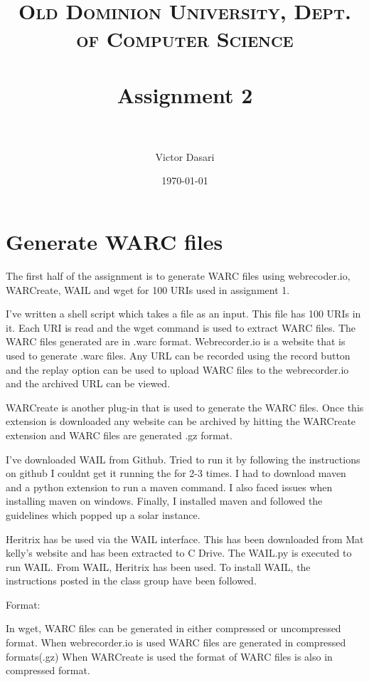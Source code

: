 \documentclass[paper=a4, fontsize=11pt]{scrartcl} %
\title{	
\normalfont \normalsize 
\textsc{Old Dominion University, Dept. of Computer Science} \\ [25pt] %
\horrule{0.5pt} \\[0.4cm] %
\huge Assignment 2 \\ %
\horrule{2pt} \\[0.5cm] %
}
\author{Victor Dasari} %
\date{\normalsize\today} %
\numberwithin{equation}{section} %
\numberwithin{figure}{section} %
\numberwithin{table}{section} %
\begin{document}
\maketitle %


\section{Generate WARC files}



The first half of the assignment is to generate WARC files using webrecoder.io, WARCreate, WAIL and wget for 100 URIs used in assignment 1.

I've written a shell script which takes a file as an input. This file has 100 URIs in it. Each URI is read and the wget command is used to extract WARC files. The WARC files generated are in .warc format.
Webrecorder.io is a website that is used to generate .warc files.
Any URL can be recorded using the record button and the replay option can be used to upload WARC files to the webrecorder.io and the archived URL can be viewed.

WARCreate is another plug-in that is used to generate the WARC files. Once this extension is downloaded any website can be archived by hitting the WARCreate extension and WARC files are generated .gz format.

I've downloaded WAIL from Github. Tried to run it by following the instructions on github I couldnt get it running the for 2-3 times. I had to download maven and a python extension to run a maven command.
I also faced issues when installing maven on windows. Finally, I installed maven and followed the guidelines which popped up a solar instance.

Heritrix has be used via the WAIL interface. This has been downloaded from Mat kelly's website and has been extracted to C Drive. The WAIL.py is executed to run WAIL. From WAIL, Heritrix has been used. To install WAIL, the instructions posted in the class group have been followed.
 
Format:

In wget, WARC files can be generated in either compressed or uncompressed format.
When webrecorder.io is used WARC files are generated in compressed formats(.gz)
When WARCreate is used the format of WARC files is also in compressed format.
\end{document}
